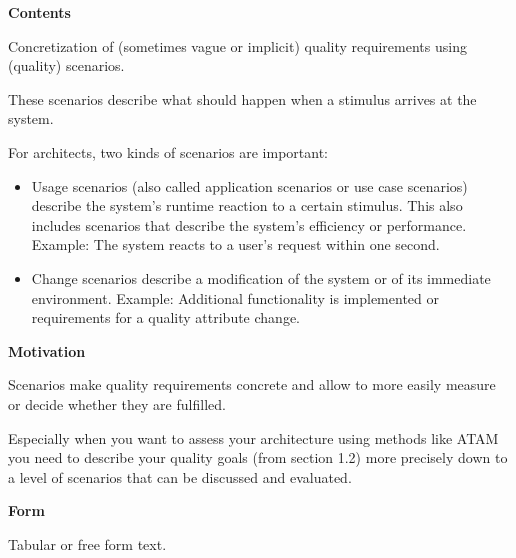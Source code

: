 \textbf{Contents}

Concretization of (sometimes vague or implicit) quality requirements
using (quality) scenarios.

These scenarios describe what should happen when a stimulus arrives at
the system.

For architects, two kinds of scenarios are important:

\begin{itemize}
\item
  Usage scenarios (also called application scenarios or use case
  scenarios) describe the system's runtime reaction to a certain
  stimulus. This also includes scenarios that describe the system's
  efficiency or performance. Example: The system reacts to a user's
  request within one second.
\item
  Change scenarios describe a modification of the system or of its
  immediate environment. Example: Additional functionality is
  implemented or requirements for a quality attribute change.
\end{itemize}

\textbf{Motivation}

Scenarios make quality requirements concrete and allow to more easily
measure or decide whether they are fulfilled.

Especially when you want to assess your architecture using methods like
ATAM you need to describe your quality goals (from section 1.2) more
precisely down to a level of scenarios that can be discussed and
evaluated.

\textbf{Form}

Tabular or free form text.
